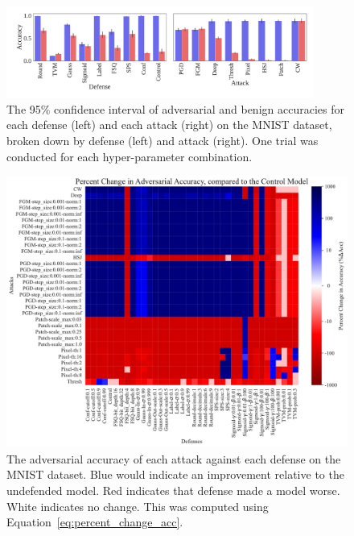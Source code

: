 \documentclass[journal]{IEEEtran}
\begin{document}
\begin{figure}[!htbp]
    {\centering
    \includegraphics[trim={0 0.85em 0 0.5em},clip,width=0.9\textwidth]{Fig17.pdf}
    \vspace{-1em}
    \caption{The 95\% confidence interval of adversarial and benign accuracies for each defense (left) and each attack (right) on the MNIST dataset, broken down by defense (left) and attack (right). One trial was conducted for each hyper-parameter combination.}
    \label{fig:mnist_acc}
    } %
\end{figure}



\begin{figure}[!htbp]
    {\centering
    \includegraphics[trim={0 0.85em 0 0.35em},clip,height=0.58\textwidth]{Fig18.pdf}
    \vspace{-0.5em}
    \caption{The adversarial accuracy of each attack against each defense on the MNIST dataset. Blue would indicate an improvement relative to the undefended model. Red indicates that defense made a model worse. White indicates no change. This was computed using Equation~\ref{eq:percent_change_acc}.}
    \label{fig:mnist_adv_acc_grid}
    } %
\end{figure}
\end{document}
